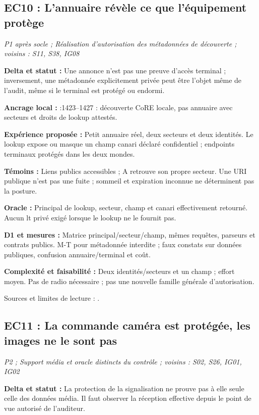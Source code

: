 \documentclass[11pt,a4paper]{article}
\newcommand{\code}[1]{{\small\ttfamily\path{#1}}}
\begin{document}
\par\noindent\begin{minipage}{\linewidth}\setlength{\parskip}{5pt}\subsection{EC10 : L'annuaire révèle ce que l'équipement protège}

\textit{P1 après socle ; Réalisation d'autorisation des métadonnées de découverte ; voisins : S11, S38, IG08}

\textbf{Delta et statut :} Une annonce n'est pas une preuve d'accès terminal ; inversement, une métadonnée explicitement privée peut être l'objet même de l'audit, même si le terminal est protégé ou endormi.\par\end{minipage}\par

{\small\textbf{Ancrage local :} \code{04_inject_vulns.yml}:1423--1427 : découverte CoRE locale, pas annuaire avec secteurs et droits de lookup attestés.}

\textbf{Expérience proposée :} Petit annuaire réel, deux secteurs et deux identités. Le lookup expose ou masque un champ canari déclaré confidentiel ; endpoints terminaux protégés dans les deux mondes.

\textbf{Témoins :} Liens publics accessibles ; A retrouve son propre secteur. Une URI publique n'est pas une fuite ; sommeil et expiration inconnue ne déterminent pas la posture.

\textbf{Oracle :} Principal de lookup, secteur, champ et canari effectivement retourné. Aucun lt privé exigé lorsque le lookup ne le fournit pas.

\textbf{D1 et mesures :} Matrice principal/secteur/champ, mêmes requêtes, parseurs et contrats publics. M-T pour métadonnée interdite ; faux constats sur données publiques, confusion annuaire/terminal et coût.

\textbf{Complexité et faisabilité :} Deux identités/secteurs et un champ ; effort moyen. Pas de radio nécessaire ; pas une nouvelle famille générale d'autorisation.

Sources et limites de lecture : \cite{resource-dir}.

\par\noindent\begin{minipage}{\linewidth}\setlength{\parskip}{5pt}\subsection{EC11 : La commande caméra est protégée, les images ne le sont pas}

\textit{P2 ; Support média et oracle distincts du contrôle ; voisins : S02, S26, IG01, IG02}

\textbf{Delta et statut :} La protection de la signalisation ne prouve pas à elle seule celle des données média. Il faut observer la réception effective depuis le point de vue autorisé de l'auditeur.\par\end{minipage}\par
\end{document}
